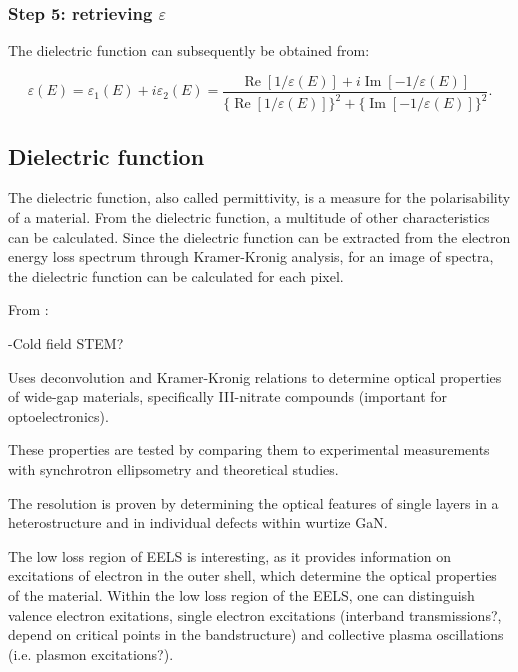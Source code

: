 \subsubsection{Step 5: retrieving $\varepsilon$}
The dielectric function  can subsequently be obtained from:

\begin{equation}
    \varepsilon(E)=\varepsilon_{1}(E)+i \varepsilon_{2}(E)=\frac{\operatorname{Re}[1 / \varepsilon(E)]+i \operatorname{Im}[-1 / \varepsilon(E)]}{\{\operatorname{Re}[1 / \varepsilon(E)]\}^{2}+\{\operatorname{Im}[-1 / \varepsilon(E)]\}^{2}}.
\end{equation}


\subsection{Dielectric function}

The dielectric function, also called permittivity, is a measure for the polarisability of a material. From the dielectric function, a multitude of other characteristics can be calculated. Since the dielectric function can be extracted from the electron energy loss spectrum through Kramer-Kronig analysis, for an image of spectra, the dielectric function can be calculated for each pixel. \cite{egerton_book}



From \cite{brockt_lakner_2000}:

-Cold field STEM?


Uses deconvolution and Kramer-Kronig relations to determine optical properties of wide-gap materials, specifically III-nitrate compounds (important for optoelectronics).

These properties are tested by comparing them to experimental measurements with synchrotron ellipsometry and theoretical studies.

The resolution is proven by determining the optical features of single layers in a heterostructure and in individual defects within wurtize GaN.


The low loss region of EELS is interesting, as it provides information on excitations of electron in the outer shell, which determine the optical properties of the material. Within the low loss region of the EELS, one can distinguish valence electron exitations, single electron excitations (interband transmissions?, depend on critical points in the bandstructure) and collective plasma oscillations (i.e. plasmon excitations?). 

